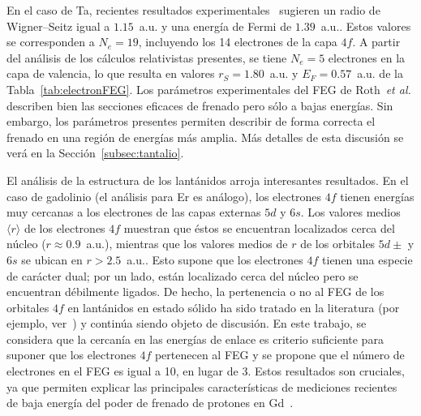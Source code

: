 En el caso de Ta, recientes resultados experimentales~\cite{Roth:17} 
sugieren un radio de Wigner--Seitz igual a $1.15$~a.u. y una energía de 
Fermi de $1.39$~a.u.. Estos valores se corresponden a $N_e=19$, 
incluyendo los 14 electrones de la capa $4f$. A partir del análisis de 
los cálculos relativistas presentes, se tiene $N_e=5$ electrones en la 
capa de valencia, lo que resulta en valores $r_S=1.80$~a.u. y 
$E_F=0.57$~a.u. de la Tabla~\ref{tab:electronFEG}. 
Los parámetros experimentales del FEG de Roth~\textit{et al.} describen 
bien las secciones eficaces de frenado pero sólo a bajas energías. Sin 
embargo, los parámetros presentes permiten describir de forma correcta 
el frenado en una región de energías más amplia. Más detalles de esta 
discusión se verá en la Sección~\ref{subsec:tantalio}.

El análisis de la estructura de los lantánidos arroja 
interesantes resultados. En el caso de gadolinio (el análisis para Er es 
análogo), los electrones $4f$ tienen energías muy cercanas a los 
electrones de las capas externas $5d$ y $6s$. Los valores medios 
$\langle r\rangle$ de los electrones $4f$ muestran que éstos se 
encuentran localizados cerca del núcleo ($r\approx 0.9$~a.u.), mientras 
que los valores medios de $r$ de los orbitales $5d\pm$ y $6s$ se ubican 
en $r>2.5$~a.u.. Esto supone que los electrones $4f$ tienen una especie 
de carácter dual; por un lado, están localizado cerca del núcleo pero se 
encuentran débilmente ligados. De hecho, la pertenencia o no al FEG de 
los orbitales $4f$ en lantánidos en estado sólido ha sido tratado en la 
literatura (por ejemplo, ver~\cite{Strange:99,Bonnelle:15}) y continúa 
siendo objeto de discusión. En este trabajo, se considera que la 
cercanía en las energías de enlace es criterio suficiente para suponer 
que los electrones $4f$ pertenecen al FEG y se propone que el número de 
electrones en el FEG es igual a 10, en lugar de 3. Estos resultados son 
cruciales, ya que permiten explicar las principales características de 
mediciones recientes~\cite{Montanari:17} de baja energía del poder de 
frenado de protones en Gd~\cite{Roth:17}. 

\begin{comment}
Bonelle & Spector: 
The discrete or extended character of 4f levels in the rare-earth metals 
and compounds remained, therefore, an open problem and the question was 
to know whether to treat the 4f levels in a core-like model or in a 
strongly correlated band model. 
\end{comment}


